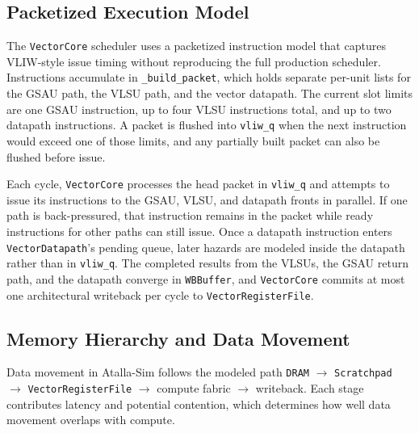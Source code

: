 \subsection{Packetized Execution Model}
The \texttt{VectorCore} scheduler uses a packetized instruction model that captures VLIW-style issue timing without reproducing the full production scheduler. Instructions accumulate in \texttt{\_build\_packet}, which holds separate per-unit lists for the GSAU path, the VLSU path, and the vector datapath. The current slot limits are one GSAU instruction, up to four VLSU instructions total, and up to two datapath instructions. A packet is flushed into \texttt{vliw\_q} when the next instruction would exceed one of those limits, and any partially built packet can also be flushed before issue.

Each cycle, \texttt{VectorCore} processes the head packet in \texttt{vliw\_q} and attempts to issue its instructions to the GSAU, VLSU, and datapath fronts in parallel. If one path is back-pressured, that instruction remains in the packet while ready instructions for other paths can still issue. Once a datapath instruction enters \texttt{VectorDatapath}'s pending queue, later hazards are modeled inside the datapath rather than in \texttt{vliw\_q}. The completed results from the VLSUs, the GSAU return path, and the datapath converge in \texttt{WBBuffer}, and \texttt{VectorCore} commits at most one architectural writeback per cycle to \texttt{VectorRegisterFile}.

\subsection{Memory Hierarchy and Data Movement}
Data movement in Atalla-Sim follows the modeled path \texttt{DRAM} $\rightarrow$ \texttt{Scratchpad} $\rightarrow$ \texttt{VectorRegisterFile} $\rightarrow$ compute fabric $\rightarrow$ writeback. Each stage contributes latency and potential contention, which determines how well data movement overlaps with compute.

